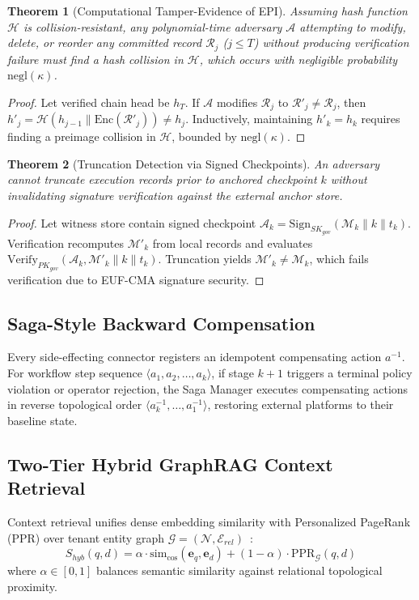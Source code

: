 \documentclass[conference]{IEEEtran}
\newtheorem{theorem}{Theorem}
\begin{document}
\begin{theorem}[Computational Tamper-Evidence of EPI]
Assuming hash function $\mathcal{H}$ is collision-resistant, any polynomial-time adversary $\mathcal{A}$ attempting to modify, delete, or reorder any committed record $\mathcal{R}_j$ ($j \le T$) without producing verification failure must find a hash collision in $\mathcal{H}$, which occurs with negligible probability $\text{negl}(\kappa)$.
\end{theorem}

\begin{proof}
Let verified chain head be $h_T$. If $\mathcal{A}$ modifies $\mathcal{R}_j$ to $\mathcal{R}'_j \ne \mathcal{R}_j$, then $h'_j = \mathcal{H}(h_{j-1} \parallel \text{Enc}(\mathcal{R}'_j)) \ne h_j$. Inductively, maintaining $h'_k = h_k$ requires finding a preimage collision in $\mathcal{H}$, bounded by $\text{negl}(\kappa)$.
\end{proof}

\begin{theorem}[Truncation Detection via Signed Checkpoints]
An adversary cannot truncate execution records prior to anchored checkpoint $k$ without invalidating signature verification against the external anchor store.
\end{theorem}

\begin{proof}
Let witness store contain signed checkpoint $\mathcal{A}_k = \text{Sign}_{SK_{gov}}(\mathcal{M}_k \parallel k \parallel t_k)$. Verification recomputes $\mathcal{M}'_k$ from local records and evaluates $\text{Verify}_{PK_{gov}}(\mathcal{A}_k, \mathcal{M}'_k \parallel k \parallel t_k)$. Truncation yields $\mathcal{M}'_k \ne \mathcal{M}_k$, which fails verification due to EUF-CMA signature security.
\end{proof}

\subsection{Saga-Style Backward Compensation}
Every side-effecting connector registers an idempotent compensating action $a^{-1}$. For workflow step sequence $\langle a_1, a_2, \dots, a_k \rangle$, if stage $k+1$ triggers a terminal policy violation or operator rejection, the Saga Manager executes compensating actions in reverse topological order $\langle a_k^{-1}, \dots, a_1^{-1} \rangle$, restoring external platforms to their baseline state.

\subsection{Two-Tier Hybrid GraphRAG Context Retrieval}
Context retrieval unifies dense embedding similarity with Personalized PageRank (PPR) over tenant entity graph $\mathcal{G} = (\mathcal{N}, \mathcal{E}_{rel})$~\cite{lewis2020rag, edge2024graphrag, page1999pagerank}:
\begin{equation}
S_{hyb}(q, d) = \alpha \cdot \text{sim}_{\cos}(\mathbf{e}_q, \mathbf{e}_d) + (1 - \alpha) \cdot \text{PPR}_{\mathcal{G}}(q, d)
\label{eq:graphrag}
\end{equation}
where $\alpha \in [0, 1]$ balances semantic similarity against relational topological proximity.
\end{document}
